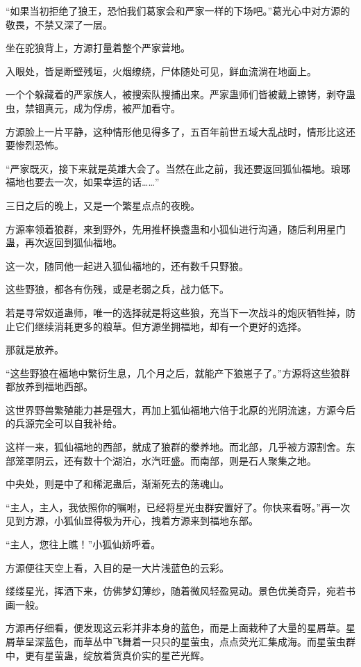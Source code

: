 \begin{this_body}
“如果当初拒绝了狼王，恐怕我们葛家会和严家一样的下场吧。”葛光心中对方源的敬畏，不禁又深了一层。

坐在驼狼背上，方源打量着整个严家营地。

入眼处，皆是断壁残垣，火烟缭绕，尸体随处可见，鲜血流淌在地面上。

一个个躲藏着的严家族人，被搜索队搜捕出来。严家蛊师们皆被戴上镣铐，剥夺蛊虫，禁锢真元，成为俘虏，被严加看守。

方源脸上一片平静，这种情形他见得多了，五百年前世五域大乱战时，情形比这还要惨烈恐怖。

“严家既灭，接下来就是英雄大会了。当然在此之前，我还要返回狐仙福地。琅琊福地也要去一次，如果幸运的话……”

三日之后的晚上，又是一个繁星点点的夜晚。

方源率领着狼群，来到野外，先用推杯换盏蛊和小狐仙进行沟通，随后利用星门蛊，再次返回到狐仙福地。

这一次，随同他一起进入狐仙福地的，还有数千只野狼。

这些野狼，都各有伤残，或是老弱之兵，战力低下。

若是寻常奴道蛊师，唯一的选择就是将这些狼，充当下一次战斗的炮灰牺牲掉，防止它们继续消耗更多的粮草。但方源坐拥福地，却有一个更好的选择。

那就是放养。

“这些野狼在福地中繁衍生息，几个月之后，就能产下狼崽子了。”方源将这些狼群都放养到福地西部。

这世界野兽繁殖能力甚是强大，再加上狐仙福地六倍于北原的光阴流速，方源今后的兵源完全可以自我补给。

这样一来，狐仙福地的西部，就成了狼群的豢养地。而北部，几乎被方源割舍。东部笼罩阴云，还有数十个湖泊，水汽旺盛。而南部，则是石人聚集之地。

中央处，则是中了和稀泥蛊后，渐渐死去的荡魂山。

“主人，主人，我依照你的嘱咐，已经将星光虫群安置好了。你快来看呀。”再一次见到方源，小狐仙显得极为开心，拽着方源来到福地东部。

“主人，您往上瞧！”小狐仙娇呼着。

方源便往天空上看，入目的是一大片浅蓝色的云彩。

缕缕星光，挥洒下来，仿佛梦幻薄纱，随着微风轻盈晃动。景色优美奇异，宛若书画一般。

方源再仔细看，便发现这云彩并非本身的蓝色，而是上面栽种了大量的星屑草。星屑草呈深蓝色，而草丛中飞舞着一只只的星萤虫，点点荧光汇集成海。而星萤虫群中，更有星萤蛊，绽放着货真价实的星芒光辉。


\end{this_body}

